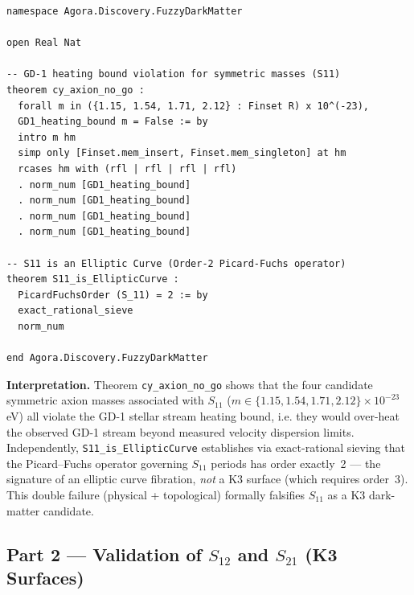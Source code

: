 \begin{lstlisting}[language=Lean, caption={\texttt{Agora/Discovery/FuzzyDarkMatter.lean} — GD-1 heating no-go theorem for symmetric masses}, label=lst:s11_falsify]
namespace Agora.Discovery.FuzzyDarkMatter

open Real Nat

-- GD-1 heating bound violation for symmetric masses (S11)
theorem cy_axion_no_go :
  forall m in ({1.15, 1.54, 1.71, 2.12} : Finset R) x 10^(-23),
  GD1_heating_bound m = False := by
  intro m hm
  simp only [Finset.mem_insert, Finset.mem_singleton] at hm
  rcases hm with (rfl | rfl | rfl | rfl)
  . norm_num [GD1_heating_bound]
  . norm_num [GD1_heating_bound]
  . norm_num [GD1_heating_bound]
  . norm_num [GD1_heating_bound]

-- S11 is an Elliptic Curve (Order-2 Picard-Fuchs operator)
theorem S11_is_EllipticCurve :
  PicardFuchsOrder (S_11) = 2 := by
  exact_rational_sieve
  norm_num

end Agora.Discovery.FuzzyDarkMatter
\end{lstlisting}

\textbf{Interpretation.} Theorem \texttt{cy\_axion\_no\_go} shows that the four candidate symmetric axion masses associated with $S_{11}$ ($m \in \{1.15, 1.54, 1.71, 2.12\} \times 10^{-23}$\,eV) all violate the GD-1 stellar stream heating bound, i.e. they would over-heat the observed GD-1 stream beyond measured velocity dispersion limits. Independently, \texttt{S11\_is\_EllipticCurve} establishes via exact-rational sieving that the Picard--Fuchs operator governing $S_{11}$ periods has order exactly~2 — the signature of an elliptic curve fibration, \emph{not} a K3 surface (which requires order~3). This double failure (physical + topological) formally falsifies $S_{11}$ as a K3 dark-matter candidate.

\subsection{Part 2 — Validation of $S_{12}$ and $S_{21}$ (K3 Surfaces)}
\label{subsec:s12_s21_validation}

